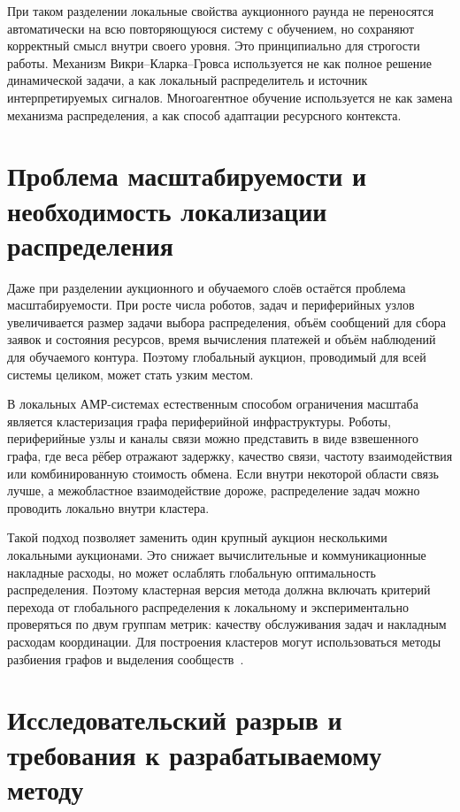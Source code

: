 При таком разделении локальные свойства аукционного раунда не переносятся автоматически на всю повторяющуюся систему с обучением, но сохраняют корректный смысл внутри своего уровня. Это принципиально для строгости работы. Механизм Викри--Кларка--Гровса используется не как полное решение динамической задачи, а как локальный распределитель и источник интерпретируемых сигналов. Многоагентное обучение используется не как замена механизма распределения, а как способ адаптации ресурсного контекста.

\section{Проблема масштабируемости и необходимость локализации распределения}

Даже при разделении аукционного и обучаемого слоёв остаётся проблема масштабируемости. При росте числа роботов, задач и периферийных узлов увеличивается размер задачи выбора распределения, объём сообщений для сбора заявок и состояния ресурсов, время вычисления платежей и объём наблюдений для обучаемого контура. Поэтому глобальный аукцион, проводимый для всей системы целиком, может стать узким местом.

В локальных АМР-системах естественным способом ограничения масштаба является кластеризация графа периферийной инфраструктуры. Роботы, периферийные узлы и каналы связи можно представить в виде взвешенного графа, где веса рёбер отражают задержку, качество связи, частоту взаимодействия или комбинированную стоимость обмена. Если внутри некоторой области связь лучше, а межобластное взаимодействие дороже, распределение задач можно проводить локально внутри кластера.

Такой подход позволяет заменить один крупный аукцион несколькими локальными аукционами. Это снижает вычислительные и коммуникационные накладные расходы, но может ослаблять глобальную оптимальность распределения. Поэтому кластерная версия метода должна включать критерий перехода от глобального распределения к локальному и экспериментально проверяться по двум группам метрик: качеству обслуживания задач и накладным расходам координации. Для построения кластеров могут использоваться методы разбиения графов и выделения сообществ~\cite{Karypis1998Metis,Blondel2008Louvain}.

\section{Исследовательский разрыв и требования к разрабатываемому методу}

